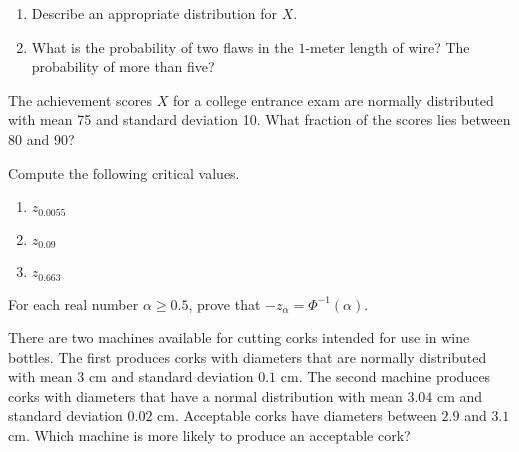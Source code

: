 \documentclass[12pt,reqno]{amsart}
\begin{document}
\medskip
\begin{enumerate}
\item Describe an appropriate distribution for $X$.\vfill
\item What is the probability of two flaws in the $1$-meter length of wire? The probability of more than five?\vfill
\end{enumerate}












\newpage
\prob The achievement scores $X$ for a college entrance exam are normally distributed with mean 75 and standard deviation 10. What fraction of the scores lies between 80 and 90?\vfill















\bigskip
\prob Compute the following critical values.

\medskip
\begin{enumerate}
\item $z_{0.0055}$\vfill
\item $z_{0.09}$\vfill
\item $z_{0.663}$\vfill
\end{enumerate}




\bigskip
\prob For each real number $\alpha\geq 0.5$, prove that $-z_\alpha = \Phi^{-1}(\alpha)$.\vfill












\bigskip
\prob There are two machines available for cutting corks intended for use in wine bottles. The first produces corks with diameters that are normally distributed with mean $3$ cm and standard deviation $0.1$ cm. The second machine produces corks with diameters that have a normal distribution with mean $3.04$ cm and standard deviation $0.02$ cm. Acceptable corks have diameters between $2.9$ and $3.1$ cm. Which machine is more likely to produce an acceptable cork?\vfill
\end{document}

